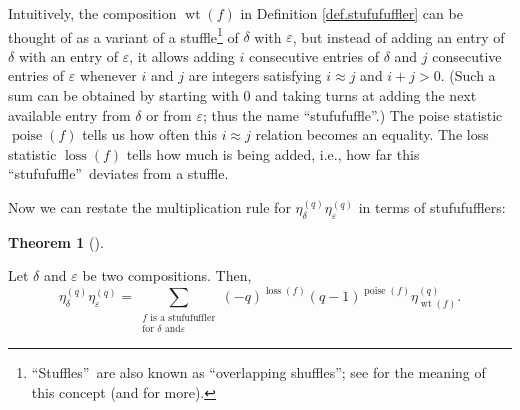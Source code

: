 \documentclass[numbers=enddot,12pt,final,onecolumn,notitlepage]{scrartcl}%
\theoremstyle{definition}
\newtheorem{theo}{Theorem}[section]
\newenvironment{theorem}[1][]
{\begin{theo}[#1]\begin{leftbar}}
{\end{leftbar}\end{theo}}
\let\sumnonlimits\sum
\renewcommand{\sum}{\sumnonlimits\limits}
\begin{document}
Intuitively, the composition $\operatorname*{wt}\left(  f\right)  $ in
Definition \ref{def.stufufuffler} can be thought of as a variant of a
stuffle\footnote{\textquotedblleft Stuffles\textquotedblright\ are also known
as \textquotedblleft overlapping shuffles\textquotedblright; see
\cite[Proposition 5.1.3 and Example 5.1.4]{GriRei} for the meaning of this
concept (and \cite{DEMT17} for more).} of $\delta$ with $\varepsilon$, but
instead of adding an entry of $\delta$ with an entry of $\varepsilon$, it
allows adding $i$ consecutive entries of $\delta$ and $j$ consecutive entries
of $\varepsilon$ whenever $i$ and $j$ are integers satisfying $i\approx j$ and
$i+j>0$. (Such a sum can be obtained by starting with $0$ and taking turns at
adding the next available entry from $\delta$ or from $\varepsilon$; thus the
name \textquotedblleft stufufuffle\textquotedblright.) The poise statistic
$\operatorname*{poise}\left(  f\right)  $ tells us how often this $i\approx j$
relation becomes an equality. The loss statistic $\operatorname*{loss}\left(
f\right)  $ tells how much is being added, i.e., how far this
\textquotedblleft stufufuffle\textquotedblright\ deviates from a stuffle.

Now we can restate the multiplication rule for $\eta_{\delta}^{\left(
q\right)  }\eta_{\varepsilon}^{\left(  q\right)  }$ in terms of stufufufflers:


\begin{theorem}
\label{thm.etaaetab}Let $\delta$ and $\varepsilon$ be two compositions. Then,%
\[
\eta_{\delta}^{\left(  q\right)  }\eta_{\varepsilon}^{\left(  q\right)  }%
=\sum_{\substack{f\text{ is a stufufuffler}\\\text{for }\delta\text{ and
}\varepsilon}}\left(  -q\right)  ^{\operatorname*{loss}\left(  f\right)
}\left(  q-1\right)  ^{\operatorname*{poise}\left(  f\right)  }\eta
_{\operatorname*{wt}\left(  f\right)  }^{\left(  q\right)  }.
\]

\end{theorem}
\end{document}
